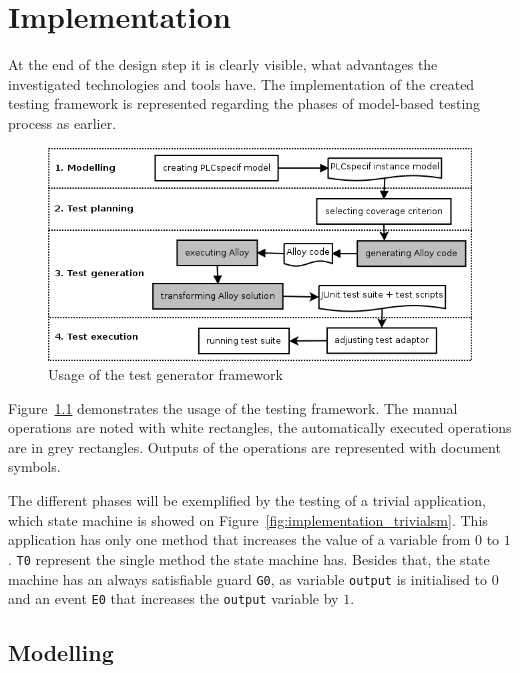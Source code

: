 \chapter{Implementation}
\label{cha:implementation}

At the end of the design step it is clearly visible, what advantages the investigated technologies and tools have. The implementation of the created testing framework is represented regarding the phases of model-based testing process as earlier.

\begin{figure}[htp]
\centering
\includegraphics[scale=0.6]{figures/implementation_usage}
\caption{Usage of the test generator framework}
\label{fig:implementation_usage}
\end{figure}

Figure~\ref{fig:implementation_usage} demonstrates the usage of the testing framework. The manual operations are noted with white rectangles, the automatically executed operations are in grey rectangles. Outputs of the operations are represented with document symbols.

The different phases will be exemplified by the testing of a trivial application, which state machine is showed on Figure~\ref{fig:implementation_trivialsm}. This application has only one method that increases the value of a variable from $0$ to $1$. \texttt{T0} represent the single method the state machine has. Besides that, the state machine has an always satisfiable guard \texttt{G0}, as variable \texttt{output} is initialised to $0$ and an event \texttt{E0} that increases the \texttt{output} variable by $1$. 

\section{Modelling}
\label{sec:implementationmodelling}

